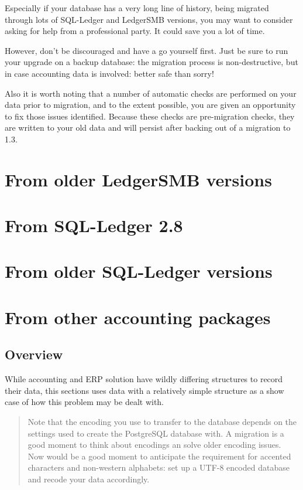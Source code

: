 Especially if your database has a very long line of history, being migrated through
lots of SQL-Ledger and LedgerSMB versions, you may want to consider asking for help
from a professional party. It could save you a lot of time.

However, don't be discouraged and have a go yourself first. Just be sure to run
your upgrade on a backup database: the migration process is non-destructive, but
in case accounting data is involved: better safe than sorry!

Also it is worth noting that a number of automatic checks are performed on your
data prior to migration, and to the extent possible, you are given an
opportunity to fix those issues identified.  Because these checks are
pre-migration checks, they are written to your old data and will persist after
backing out of a migration to 1.3.

\section{From older LedgerSMB versions}
\label{sec-migration-from-older-ledgersmb}

\section{From SQL-Ledger 2.8}
\label{sec-migration-from-sql-ledger-28}

\section{From older SQL-Ledger versions}
\label{sec-migration-from-older-sql-ledger}

\section{From other accounting packages}
\label{sec-migration-from-other-accounting-systems}

\subsection{Overview}





While accounting and ERP solution have wildly differing structures to record their
data, this sections uses data with a relatively simple structure as a show case of
how this problem may be dealt with.

\begin{quote}
Note that the encoding you use to transfer to the database depends on the settings
used to create the PostgreSQL database with.  A migration is a good moment to think
about encodings an solve older encoding issues.  Now would be a good moment to
anticipate the requirement for accented characters and non-western alphabets: set up
a UTF-8 encoded database and recode your data accordingly.
\end{quote}

